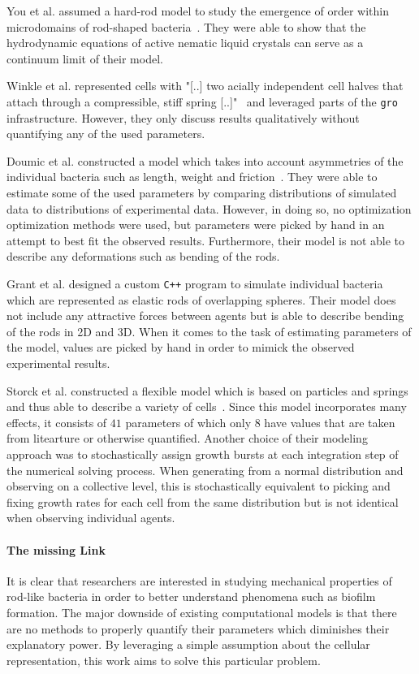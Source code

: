 \documentclass{article}
\begin{document}
You et al. assumed a hard-rod model to study the emergence of order within microdomains  of
rod-shaped bacteria~\cite{You2018}.
They were able to show that the hydrodynamic equations of active nematic liquid crystals can serve
as a continuum limit of their model.

Winkle et al. represented cells with "[..] two acially independent cell halves that attach through a
compressible, stiff spring [..]"~\cite{Winkle2017} and leveraged parts of the \texttt{gro}
infrastructure.
However, they only discuss results qualitatively without quantifying any of the used parameters.

Doumic et al. constructed a model which takes into account asymmetries of the individual bacteria
such as length, weight and friction~\cite{Doumic2020}.
They were able to estimate some of the used parameters by comparing distributions of simulated data
to distributions of experimental data.
However, in doing so, no optimization optimization methods were used, but parameters were picked by
hand in an attempt to best fit the observed results.
Furthermore, their model is not able to describe any deformations such as bending of the rods.

Grant et al. designed a custom \texttt{C++} program to simulate individual
bacteria~\cite{Grant2014} which are represented as elastic rods of overlapping spheres.
Their model does not include any attractive forces between agents but is able to describe bending of
the rods in 2D and 3D.
When it comes to the task of estimating parameters of the model, values are picked by hand in order
to mimick the observed experimental results.

Storck et al. constructed a flexible model which is based on particles and springs and thus able to
describe a variety of cells~\cite{Storck2014}.
Since this model incorporates many effects, it consists of $41$ parameters of which only $8$ have
values that are taken from litearture or otherwise quantified.
Another choice of their modeling approach was to stochastically assign growth bursts at each
integration step of the numerical solving process.
When generating from a normal distribution and observing on a collective level, this is
stochastically equivalent to picking and fixing growth rates for each cell from the same
distribution but is not identical when observing individual agents.

\paragraph{The missing Link}
It is clear that researchers are interested in studying mechanical properties of rod-like bacteria
in order to better understand phenomena such as biofilm formation.
The major downside of existing computational models is that there are no methods to properly
quantify their parameters which diminishes their explanatory power.
By leveraging a simple assumption about the cellular representation, this work aims to solve this
particular problem.
\end{document}
